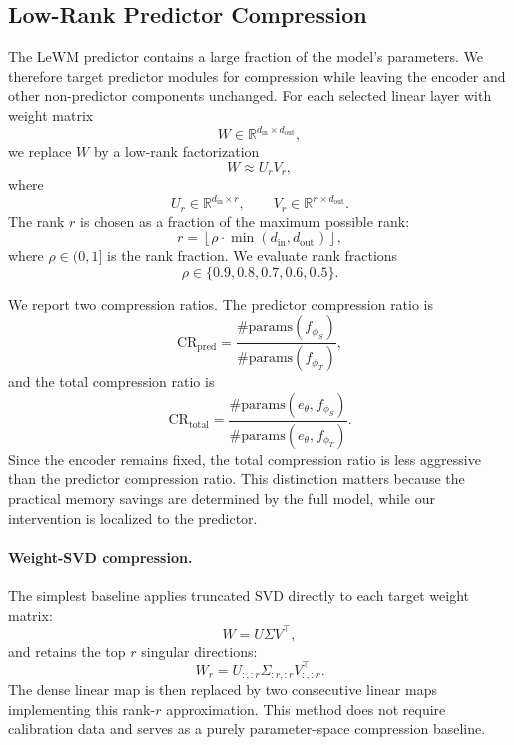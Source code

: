 \documentclass[11pt]{article}
\begin{document}
\subsection{Low-Rank Predictor Compression}
\label{sec:low_rank_compression}

The LeWM predictor contains a large fraction of the model's parameters. We therefore target predictor modules for compression while leaving the encoder and other non-predictor components unchanged. For each selected linear layer with weight matrix
\[
    W \in \mathbb{R}^{d_{\mathrm{in}} \times d_{\mathrm{out}}},
\]
we replace $W$ by a low-rank factorization
\[
    W \approx U_r V_r,
\]
where
\[
    U_r \in \mathbb{R}^{d_{\mathrm{in}} \times r},
    \qquad
    V_r \in \mathbb{R}^{r \times d_{\mathrm{out}}}.
\]
The rank $r$ is chosen as a fraction of the maximum possible rank:
\[
    r = \left\lfloor \rho \cdot \min(d_{\mathrm{in}}, d_{\mathrm{out}}) \right\rfloor,
\]
where $\rho \in (0,1]$ is the rank fraction. We evaluate rank fractions
\[
    \rho \in \{0.9, 0.8, 0.7, 0.6, 0.5\}.
\]

We report two compression ratios. The predictor compression ratio is
\[
    \mathrm{CR}_{\mathrm{pred}}
    =
    \frac{\#\mathrm{params}(f_{\phi_S})}
    {\#\mathrm{params}(f_{\phi_T})},
\]
and the total compression ratio is
\[
    \mathrm{CR}_{\mathrm{total}}
    =
    \frac{\#\mathrm{params}(e_\theta, f_{\phi_S})}
    {\#\mathrm{params}(e_\theta, f_{\phi_T})}.
\]
Since the encoder remains fixed, the total compression ratio is less aggressive than the predictor compression ratio. This distinction matters because the practical memory savings are determined by the full model, while our intervention is localized to the predictor.

\paragraph{Weight-SVD compression.}
The simplest baseline applies truncated SVD directly to each target weight matrix:
\[
    W = U \Sigma V^\top,
\]
and retains the top $r$ singular directions:
\[
    W_r = U_{:,:r}\Sigma_{:r,:r}V_{:,:r}^\top.
\]
The dense linear map is then replaced by two consecutive linear maps implementing this rank-$r$ approximation. This method does not require calibration data and serves as a purely parameter-space compression baseline.
\end{document}
